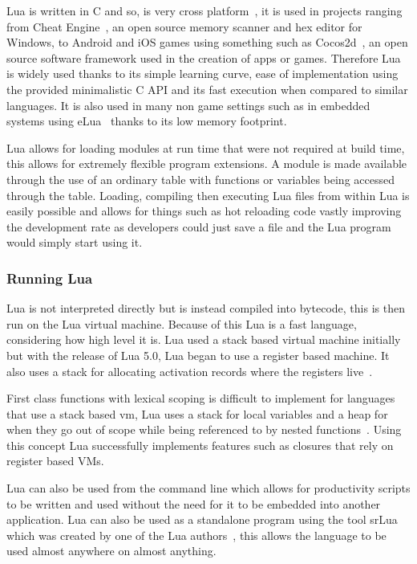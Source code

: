 \documentclass[11pt,a4paper,titlepage]{article}
\begin{document}
			Lua is written in C and so, is very cross platform~\cite{LuaSource}, it is used in projects ranging from Cheat Engine~\cite{CheatEngine}, an open source memory scanner and hex editor for Windows, to Android and iOS games using something such as Cocos2d~\cite{COCOS2D}, an open source software framework used in the creation of apps or games. Therefore Lua is widely used thanks to its simple learning curve, ease of implementation using the provided minimalistic C API and its fast execution when compared to similar languages. It is also used in many non game settings such as in embedded systems using eLua~\cite{eLua} thanks to its low memory footprint.

			Lua allows for loading modules at run time that were not required at build time, this allows for extremely flexible program extensions. A module is made available through the use of an ordinary table with functions or variables being accessed through the table. Loading, compiling then executing Lua files from within Lua is easily possible and allows for things such as hot reloading code vastly improving the development rate as developers could just save a file and the Lua program would simply start using it.
				
		\subsubsection{Running Lua}
			Lua is not interpreted directly but is instead compiled into bytecode, this is then run on the Lua virtual machine. Because of this Lua is a fast language, considering how high level it is. Lua used a stack based virtual machine initially but with the release of Lua 5.0, Lua began to use a register based machine. It also uses a stack for allocating activation records where the registers live~\cite{IerusalimschyImplementation}.

			First class functions with lexical scoping is difficult to implement for languages that use a stack based vm, Lua uses a stack for local variables and a heap for when they go out of scope while being referenced to by nested functions~\cite{IerusalimschyImplementation}. Using this concept Lua successfully implements features such as closures that rely on register based VMs.

			Lua can also be used from the command line which allows for productivity scripts to be written and used without the need for it to be embedded into another application. Lua can also be used as a standalone program using the tool srLua which was created by one of the Lua authors~\cite{tecgrafLibAndTools}, this allows the language to be used almost anywhere on almost anything.
\end{document}
